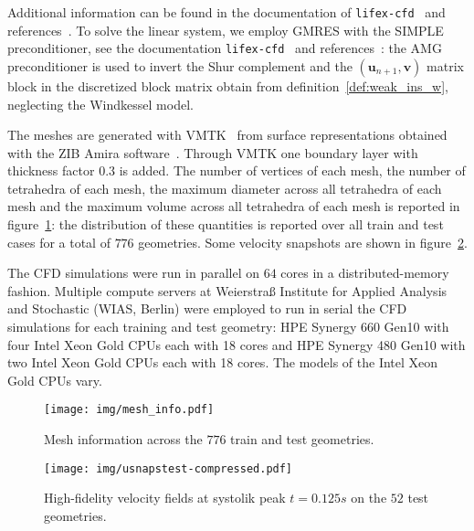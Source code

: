 Additional information can be found in the documentation of \texttt{lifex-cfd}~\cite{AFRICA2024109039} and references~\cite{Fumagalli2020, Fedele2017, bazilevs2007variational, forti2015semi}. To solve the linear system, we employ GMRES with the SIMPLE preconditioner, see the documentation \texttt{lifex-cfd}~\cite{AFRICA2024109039} and references~\cite{Deparis2014}: the AMG preconditioner is used to invert the Shur complement and the $(\mathbf{u}_{n+1},\mathbf{v})$ matrix block in the discretized block matrix obtain from definition~\ref{def:weak_ins_w}, neglecting the Windkessel model.

The meshes are generated with VMTK~\cite{antiga2008image} from surface representations obtained with the ZIB Amira software~\cite{stalling2005amira}. Through VMTK one boundary layer with thickness factor $0.3$ is added. The number of vertices of each mesh, the number of tetrahedra of each mesh, the maximum diameter across all tetrahedra of each mesh and the maximum volume across all tetrahedra of each mesh is reported in figure~\ref{fig:mesh_info}: the distribution of these quantities is reported over all train and test cases for a total of $776$ geometries. Some velocity snapshots are shown in figure~\ref{fig:snapsu}.

The CFD simulations were run in parallel on $64$ cores in a distributed-memory fashion. Multiple compute servers at Weierstraß Institute for Applied Analysis and Stochastic (WIAS, Berlin) were employed to run in serial the CFD simulations for each training and test geometry: HPE Synergy 660 Gen10 with four Intel Xeon Gold CPUs each with 18 cores and HPE Synergy 480 Gen10 with two Intel Xeon Gold CPUs each with 18 cores. The models of the Intel Xeon Gold CPUs vary.

\begin{figure}[!htp]
  \centering
  \texttt{[image: img/mesh\_info.pdf]}
  \caption{Mesh information across the $776$ train and test geometries.}
  \label{fig:mesh_info}
\end{figure}

\begin{figure}[!htp]
  \centering
  \texttt{[image: img/usnapstest-compressed.pdf]}
  \caption{High-fidelity velocity fields at systolik peak $t=0.125s$ on the $52$ test geometries.}
  \label{fig:snapsu}
\end{figure}

